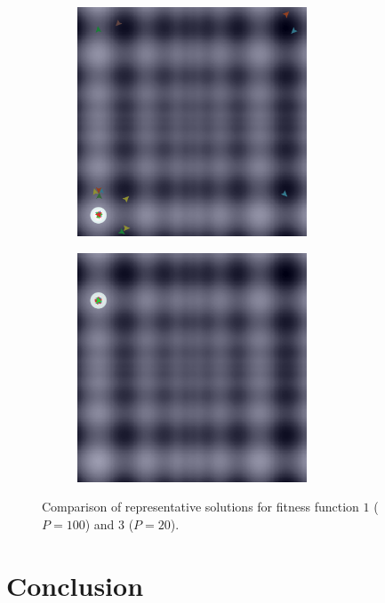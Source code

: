 \documentclass[12pt]{article}
\begin{document}
\begin{figure}
\begin{subfigure}[c]{0.5\textwidth}
\centering
\includegraphics[width=0.75\textwidth]{figures/ex5/f3-3.png}
\end{subfigure}
\begin{subfigure}[c]{0.5\textwidth}
\centering
\includegraphics[width=0.75\textwidth]{figures/ex5/f3-20.png}
\end{subfigure}

\caption{Comparison of representative solutions for fitness function $1$ ($P=100$) and $3$ ($P=20$).}

\end{figure}


\section{Conclusion}





\end{document}
